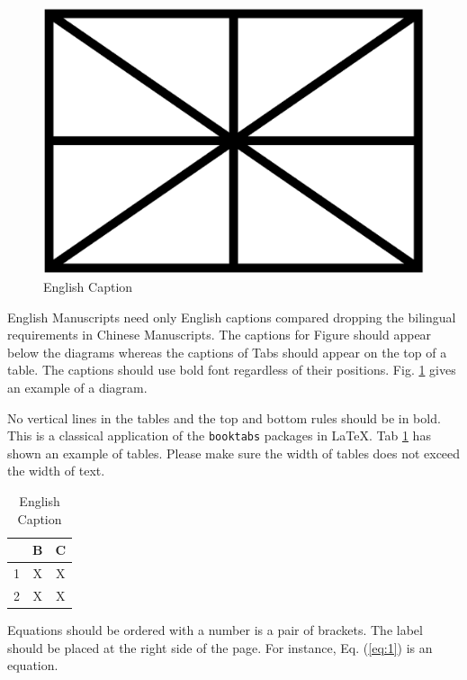 \documentclass[UTF8,a4paper]{article}
\begin{document}
\begin{figure}[htb]
	\centering
	\includegraphics[scale=1.0]{figure/figure.png}
	\caption{English Caption}
	\label{fig:figure}
\end{figure}

English Manuscripts need only English captions compared dropping the bilingual requirements in Chinese Manuscripts. The captions for Figure should appear below the diagrams whereas the captions of Tabs should appear on the top of a table. The captions should use bold font regardless of their positions. Fig. \ref{fig:figure} gives an example of a diagram.

No vertical lines in the tables and the top and bottom rules should be in bold. This is a classical application of the \texttt{booktabs} packages in \LaTeX. Tab \ref{tab:table} has shown an example of tables. Please make sure the width of tables does not exceed the width of text.

\begin{table}[htb]
	\centering
	\caption{English Caption}
	\begin{tabular}{ccc}
		\toprule[1pt]
		  & B & C \\
		\midrule[0.5pt]
		1 & X & X \\
		\midrule[0.5pt]
		2 & X & X \\
		\bottomrule[1pt]
	\end{tabular}
	\label{tab:table}
\end{table}

Equations should be ordered with a number is a pair of brackets. The label should be placed at the right side of the page. For instance, Eq. (\ref{eq:1}) is an equation.
\end{document}
